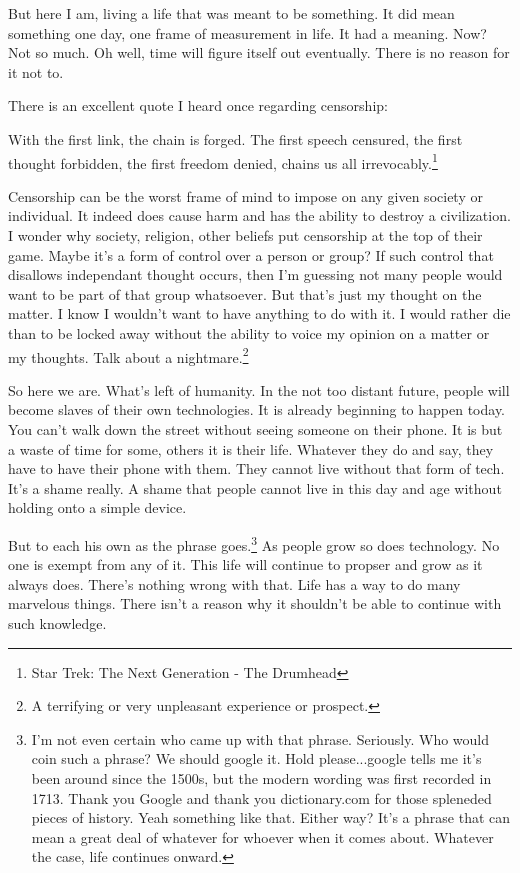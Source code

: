 But here I am, living a life that was meant to be something. It did mean 
something one day, one frame of measurement in life. It had a meaning. Now? 
Not so much. Oh well, time will figure itself out eventually. There is no reason
for it not to.

There is an excellent quote I heard once regarding censorship:

\begin{displayquote}
With the first link, the chain is forged. The first speech censured, the first 
thought forbidden, the first freedom denied, chains us all 
irrevocably.\footnote{Star Trek: The Next Generation - The Drumhead}
\end{displayquote}

Censorship can be the worst frame of mind to impose on any given society or
individual. It indeed does cause harm and has the ability to destroy a
civilization. I wonder why society, religion, other beliefs put censorship at
the top of their game. Maybe it's a form of control over a person or group? If
such control that disallows independant thought occurs, then I'm guessing not
many people would want to be part of that group whatsoever. But that's just my
thought on the matter. I know I wouldn't want to have anything to do with it. I
would rather die than to be locked away without the ability to voice my opinion
on a matter or my thoughts. Talk about a nightmare.\footnote{A terrifying or 
very unpleasant experience or prospect.}

So here we are. What's left of humanity. In the not too distant future, people
will become slaves of their own technologies. It is already beginning to happen
today. You can't walk down the street without seeing someone on their phone. It
is but a waste of time for some, others it is their life. Whatever they do and
say, they have to have their phone with them. They cannot live without that form
of tech. It's a shame really. A shame that people cannot live in this day and
age without holding onto a simple device.

But to each his own as the phrase goes.\footnote{I'm not even certain who came
up with that phrase. Seriously. Who would coin such a phrase? We should google
it. Hold please...google tells me it's been around since the 1500s, but the 
modern wording was first recorded in 1713. Thank you Google and thank you
dictionary.com for those spleneded pieces of history. Yeah something like that.
Either way? It's a phrase that can mean a great deal of whatever for whoever
when it comes about. Whatever the case, life continues onward.} As people grow
so does technology. No one is exempt from any of it. This life will continue
to propser and grow as it always does. There's nothing wrong with that. Life
has a way to do many marvelous things. There isn't a reason why it shouldn't be
able to continue with such knowledge.


